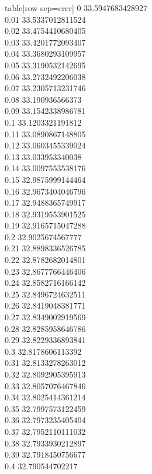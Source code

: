   table[row sep=crcr]{%
0	33.5947683428927\\
0.01	33.5337012811524\\
0.02	33.4754410680405\\
0.03	33.4201772093407\\
0.04	33.3680293109957\\
0.05	33.3190532142695\\
0.06	33.2732492206038\\
0.07	33.2305713231746\\
0.08	33.190936566373\\
0.09	33.1542338986781\\
0.1	33.1203321191812\\
0.11	33.0890867148805\\
0.12	33.0603455339024\\
0.13	33.033953340038\\
0.14	33.0097553538176\\
0.15	32.9875999144464\\
0.16	32.9673404046796\\
0.17	32.9488365749917\\
0.18	32.9319553901525\\
0.19	32.9165715047288\\
0.2	32.9025674567777\\
0.21	32.8898336526785\\
0.22	32.8782682014801\\
0.23	32.8677766446406\\
0.24	32.8582716166142\\
0.25	32.8496724632511\\
0.26	32.8419048381771\\
0.27	32.8349002919569\\
0.28	32.8285958646786\\
0.29	32.8229336893841\\
0.3	32.8178606113392\\
0.31	32.8133278263012\\
0.32	32.8092905395913\\
0.33	32.8057076467846\\
0.34	32.8025414361214\\
0.35	32.7997573122459\\
0.36	32.7973235405404\\
0.37	32.7952110111032\\
0.38	32.7933930212897\\
0.39	32.7918450756677\\
0.4	32.790544702217\\
}

